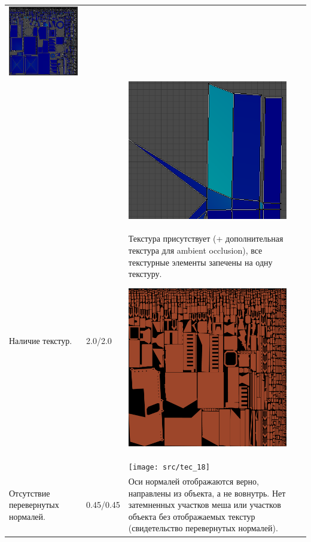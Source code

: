 \begin{longtable}{|p{4cm}|p{2.5cm}|p{7.5cm}|}
    \includegraphics[width=7cm]{src/uv_11}\\
    & & \includegraphics[width=7cm]{src/uv_12}\\
    \hline
    Наличие текстур. & 2.0/2.0 & Текстура присутствует (+ дополнительная текстура для ambient occlusion), все текстурные элементы запечены на одну текстуру. 

    \includegraphics[width=7cm]{src/tec_17}\\
    & & \texttt{[image: src/tec\_18]}\\
    \hline
    Отсутствие перевернутых нормалей. & 0.45/0.45 & Оси нормалей отображаются верно, направлены из объекта, а не вовнутрь. Нет затемненных участков меша или участков объекта без отображаемых текстур (свидетельство перевернутых нормалей).


\end{longtable}
